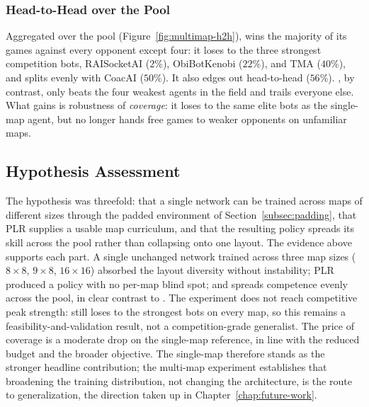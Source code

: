 \subsubsection{Head-to-Head over the Pool}
\label{subsec:multimap-h2h}

Aggregated over the pool (Figure~\ref{fig:multimap-h2h}),  wins the majority of its games against every opponent except four: it loses to the three strongest competition bots, RAISocketAI ($2$\%), ObiBotKenobi ($22$\%), and TMA ($40$\%), and splits evenly with CoacAI ($50$\%). It also edges out  head-to-head ($56$\%). , by contrast, only beats the four weakest agents in the field and trails everyone else. What  gains is robustness of \emph{coverage}: it loses to the same elite bots as the single-map agent, but no longer hands free games to weaker opponents on unfamiliar maps.

\subsection{Hypothesis Assessment}
\label{subsec:multimap-assessment}

The hypothesis was threefold: that a single network can be trained across maps of different sizes through the padded environment of Section~\ref{subsec:padding}, that PLR supplies a usable map curriculum, and that the resulting policy spreads its skill across the pool rather than collapsing onto one layout. The evidence above supports each part. A single unchanged network trained across three map sizes ($8{\times}8$, $9{\times}8$, $16{\times}16$) absorbed the layout diversity without instability; PLR produced a policy with no per-map blind spot; and  spreads competence evenly across the pool, in clear contrast to . The experiment does not reach competitive peak strength:  still loses to the strongest bots on every map, so this remains a feasibility-and-validation result, not a competition-grade generalist. The price of coverage is a moderate drop on the single-map reference, in line with the reduced budget and the broader objective. The single-map  therefore stands as the stronger headline contribution; the multi-map experiment establishes that broadening the training distribution, not changing the architecture, is the route to generalization, the direction taken up in Chapter~\ref{chap:future-work}.